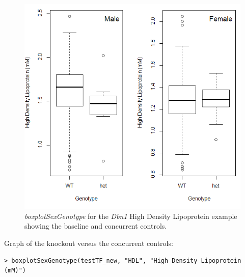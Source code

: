 \documentclass[12pt,a4paper]{article}
\begin{document}
\begin{figure}[H]%
\centerline{\includegraphics[scale=0.5]{cs_tf_1.jpg}}
\caption{\textit{boxplotSexGenotype} for the \textit{Dbn1} High Density Lipoprotein example showing the baseline and concurrent controls.}\label{fig:cs_tf1}
\end{figure}

Graph of the knockout versus the concurrent controls:
 
\begingroup
\fontsize{8pt}{12pt}\selectfont
\begin{verbatim}
> boxplotSexGenotype(testTF_new, "HDL", "High Density Lipoprotein (mM)")
\end{verbatim}
\endgroup 
\end{document}
